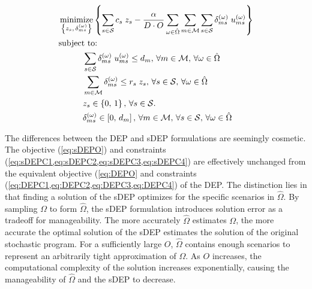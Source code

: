 \documentclass[12pt,dvipsnames]{report}
\DeclareMathOperator*{\argmin}{minimize}
\begin{document}
\begin{tcolorbox}[floatplacement = ht, float, title = Sampled Deterministic Equivalent Program (sDEP) of \Cref{eq:SOPS1O,eq:SOPS1C1,eq:SOPS2O,eq:SOPS2C1,eq:SOPS2C2,eq:SOPS2C3,eq:SOPS2C4}]
	\begin{align}
		& \argmin_{\left\{ z_s,\, \delta_{ms}^{\left( \omega \right)} \right\}} \left\{ \sum_{s \in \mathcal{S}} c_s \; z_s - \frac{\alpha}{D \cdot O} \sum_{\omega \in \hat{\Omega}} \sum_{m \in \mathcal{M}} \sum_{s \in \mathcal{S}} \delta_{ms}^{\left( \omega \right)} \; u_{ms}^{\left( \omega \right)} \right\} \label{eq:sDEPO}\\
		& \text{subject to:}  \nonumber \\
		& \hspace{0.4in} \sum_{s \in \mathcal{S}} \delta_{ms}^{\left( \omega \right)} \; u_{ms}^{\left( \omega \right)} \leq d_m,\, \forall m \in \mathcal{M},\, \forall \omega \in \hat{\Omega} \label{eq:sDEPC1}\\
		& \hspace{0.4in} \sum_{m \in \mathcal{M}} \delta_{ms}^{\left( \omega \right)} \leq r_s \; z_s,\, \forall s \in \mathcal{S},\, \forall \omega \in \hat{\Omega} \label{eq:sDEPC2}\\
		& \hspace{0.4in} z_s \in \left\{ 0,\, 1 \right\},\, \forall s \in \mathcal{S}. \label{eq:sDEPC3}\\
		& \hspace{0.4in} \delta_{ms}^{\left( \omega \right)} \in \left[ 0,\, d_m \right],\, \forall m \in \mathcal{M},\, \forall s \in \mathcal{S},\, \forall \omega \in \hat{\Omega} \label{eq:sDEPC4}
	\end{align}
\end{tcolorbox}

The differences between the DEP and sDEP formulations are seemingly cosmetic.  The objective (\cref{eq:sDEPO}) and constraints (\cref{eq:sDEPC1,eq:sDEPC2,eq:sDEPC3,eq:sDEPC4}) are effectively unchanged from the equivalent objective (\cref{eq:DEPO} and constraints (\cref{eq:DEPC1,eq:DEPC2,eq:DEPC3,eq:DEPC4}) of the DEP.  The distinction lies in that finding a solution of the sDEP optimizes for the specific scenarios in $\hat{\Omega}$.  By sampling $\Omega$ to form $\hat{\Omega}$, the sDEP formulation introduces solution error as a tradeoff for manageability.  The more accurately $\hat{\Omega}$ estimates $\Omega$, the more accurate the optimal solution of the sDEP estimates the solution of the original stochastic program.  For a sufficiently large $O$, $\hat{\Omega}$ contains enough scenarios to represent an arbitrarily tight approximation of $\Omega$.  As $O$ increases, the computational complexity of the solution increases exponentially, causing the manageability of $\hat{\Omega}$ and the sDEP to decrease.
\end{document}
